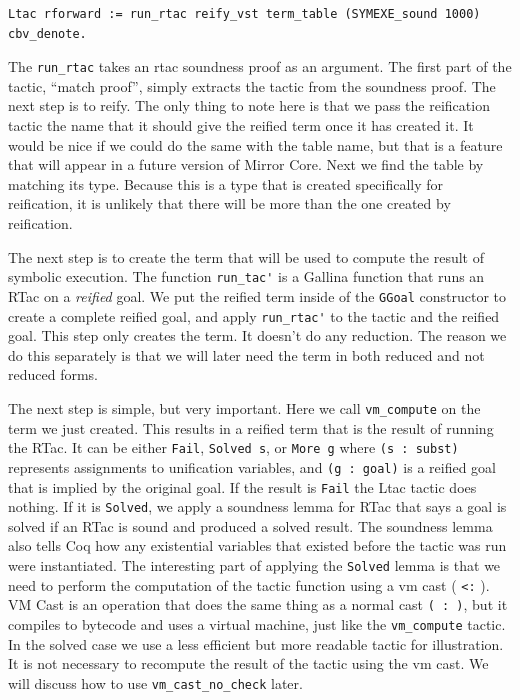 \documentclass{puthesis}
\begin{document}
\begin{lstlisting}
Ltac rforward := run_rtac reify_vst term_table (SYMEXE_sound 1000) cbv_denote.
\end{lstlisting}

The \lstinline|run_rtac| takes an rtac soundness proof as an
argument. The first part of the tactic, ``match proof'', simply
extracts the tactic from the soundness proof. The next step is to
reify. The only thing to note here is that we pass the reification
tactic the name that it should give the reified term once it has
created it. It would be nice if we could do the same with the table
name, but that is a feature that will appear in a future version of
Mirror Core. Next we find the table by matching its type. Because this
is a type that is created specifically for reification, it is
unlikely that there will be more than the one created by reification. 

The next step is to create the term that will be used to compute the
result of symbolic execution. The function \lstinline|run_tac'| is a
Gallina function that runs an RTac on a \emph{reified} goal. We put
the reified term inside of the \lstinline|GGoal| constructor to create
a complete reified goal, and apply \lstinline|run_rtac'| to the tactic
and the reified goal.  This step only creates the term. It doesn't do
any reduction. The reason we do this separately is that we will later
need the term in both reduced and not reduced forms. 

The next step is simple, but very important. Here we call
\lstinline|vm_compute| on the term we just created. This results in a
reified term that is the result of running the RTac. It can be either
\lstinline|Fail|, \lstinline|Solved s|, or \lstinline|More g| where
\lstinline|(s : subst)| represents assignments to unification
variables, and \lstinline|(g : goal)| is a reified goal that is
implied by the original goal. If the result is \lstinline|Fail| the
Ltac tactic does nothing. If it is \lstinline|Solved|, we apply a
soundness lemma for RTac that says a goal is solved if an
RTac is sound and produced a solved result. The soundness lemma also
tells Coq how any existential variables that existed before the tactic was run
were instantiated. The interesting part of applying the
\lstinline|Solved| lemma is that we need to perform the computation of
the tactic function using a vm cast ( \lstinline|<:| ). VM Cast is an
operation that does the same thing as a normal cast \lstinline|( : )|,
but it compiles to bytecode and uses a virtual machine, just like the
\lstinline|vm_compute| tactic. In the solved case we use a less
efficient but more readable tactic for illustration. It is not
necessary to recompute the result of the tactic using the vm cast. We
will discuss how to use \lstinline|vm_cast_no_check| later.
\end{document}
